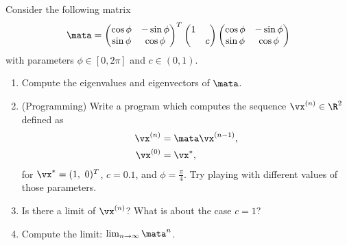\begin{Sheet}
  \begin{Problem}
  	Consider the following matrix
  	\begin{gather*}
  	\mata =
  	\begin{pmatrix}
  	\cos\phi & -\sin\phi\\
  	\sin\phi &  \cos\phi
  	\end{pmatrix}^T
  	\begin{pmatrix}
  	1 & \\
  	& c
  	\end{pmatrix}
  	\begin{pmatrix}
  	\cos\phi & -\sin\phi\\
  	\sin\phi &  \cos\phi
  	\end{pmatrix}
  	\end{gather*}
  	with parameters $\phi\in[0,2\pi]$ and $c\in(0,1)$.
  	\begin{enumerate}
  		\item Compute the eigenvalues and eigenvectors of $\mata$.
  		\item (Programming) Write a program which computes the sequence
  		$\vx^{(n)}\in\R^2$ defined as
  		\begin{align*}
  		\vx^{(n)} &= \mata \vx^{(n-1)}, \\
  		\vx^{(0)} &= \vx^{*},
  		\end{align*}
  		for $\vx^{*} = (1,\ 0)^T$, $c = 0.1$, and
  		$\phi=\frac\pi4$. Try playing with different values of those
  		parameters.
  		\item Is there a limit of $\vx^{(n)}$? What is about the case
  		$c=1$?
  		\item Compute the limit: $\lim_{n\to\infty}\mata^n$.
  	\end{enumerate}
  \end{Problem}

\end{Sheet}


